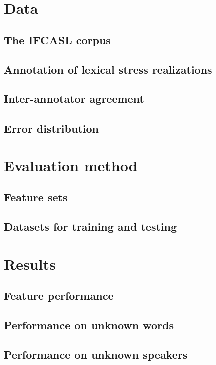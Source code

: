 \documentclass[a4paper]{article}
\begin{document}
	\section{Data}
	\label{sec:data}
		\subsection{The IFCASL corpus}
		\subsection{Annotation of lexical stress realizations}
		\subsection{Inter-annotator agreement}
		\subsection{Error distribution}
	
	\section{Evaluation method}
	\label{sec:method}
	    \subsection{Feature sets}
	    \subsection{Datasets for training and testing}

	\section{Results}
	\label{sec:results}
		\subsection{Feature performance}
		\subsection{Performance on unknown words}
		\subsection{Performance on unknown speakers}
	
\end{document}
